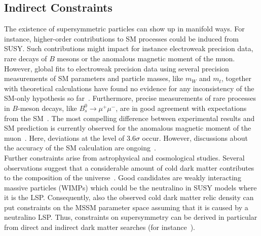 \subsection{Indirect Constraints}
\label{subsec:susy_indirect}
The existence of supersymmetric particles can show up in manifold ways. For instance, higher-order contributions to SM processes could be induced from SUSY. Such contributions might impact for instance electroweak precision data, rare decays of $B$ mesons or the anomalous magnetic moment of the muon. However, global fits to electroweak precision data using several precision measurements of SM parameters and particle masses, like $m_W$ and $m_t$, together with theoretical calculations have found no evidence for any inconsistency of the SM-only hypothesis so far~\cite{LEP-2, Erler:2012wz, Ciuchini:2013pca, Baak:2014ora}. Furthermore, precise measurements of rare processes in $B$-meson decays, like $B_s^0 \rightarrow \mu^+ \mu^-$, are in good agreement with expectations from the SM~\cite{Chatrchyan:2013bka, Aaij:2013aka, CMS-PAS-BPH-13-007}. The most compelling difference between experimental results and SM prediction is currently observed for the anomalous magnetic moment of the muon~\cite{Bennett:2006fi, Hagiwara:2011af, Agashe:2014kda}. Here, deviations at the level of $3.6\sigma$ occur. However, discussions about the accuracy of the SM calculation are ongoing~\cite{Davier:2010nc}. \\  
Further constraints arise from astrophysical and cosmological studies. Several observations suggest that a considerable amount of cold dark matter contributes to the composition of the universe~\cite{wmap, Ade:2013zuv}. Good candidates are weakly interacting massive particles (WIMPs) which could be the neutralino in SUSY models where it is the LSP. Consequently, also the observed cold dark matter relic density can put constraints on the MSSM parameter space assuming that it is caused by a neutralino LSP. Thus, constraints on supersymmetry can be derived in particular from direct and indirect dark matter searches (\cf for instance~\cite{cerdeno2010direct, Cirelli:2010xx, PhysRevLett.109.181301, Ackermann:2013uma, Agnese:2013jaa, Angloher:2014myn, PhysRevLett.113.121101, Abramowski:2014tra}). 

